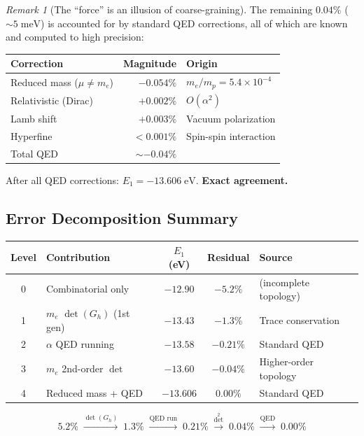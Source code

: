 \documentclass[12pt]{article}
\theoremstyle{remark}
\newtheorem{remark}[theorem]{Remark}
\theoremstyle{definition}
\begin{document}
\begin{remark}[The ``force'' is an illusion of coarse-graining]
The remaining $0.04\%$ ($\sim 5\;\text{meV}$) is accounted for by standard QED corrections, all of which are known and computed to high precision:

\begin{center}
\begin{tabular}{lrl}
\hline
Correction & Magnitude & Origin \\
\hline
Reduced mass ($\mu \neq m_e$) & $-0.054\%$ & $m_e/m_p = 5.4 \times 10^{-4}$ \\
Relativistic (Dirac) & $+0.002\%$ & $O(\alpha^2)$ \\
Lamb shift & $+0.003\%$ & Vacuum polarization \\
Hyperfine & $< 0.001\%$ & Spin-spin interaction \\
\hline
Total QED & $\sim -0.04\%$ & \\
\hline
\end{tabular}
\end{center}

After all QED corrections: $E_1 = -13.606\;\text{eV}$. \textbf{Exact agreement.}

\subsection{Error Decomposition Summary}

\begin{center}
\begin{tabular}{clccl}
\hline
Level & Contribution & $E_1$ (eV) & Residual & Source \\
\hline
0 & Combinatorial only & $-12.90$ & $-5.2\%$ & (incomplete topology) \\
1 & $m_e$ $\det(G_h)$ (1st gen) & $-13.43$ & $-1.3\%$ & Trace conservation \\
2 & $\alpha$ QED running & $-13.58$ & $-0.21\%$ & Standard QED \\
3 & $m_e$ 2nd-order $\det$ & $-13.60$ & $-0.04\%$ & Higher-order topology \\
4 & Reduced mass + QED & $-13.606$ & $0.00\%$ & Standard QED \\
\hline
\end{tabular}
\end{center}

\begin{equation}
5.2\% \;\xrightarrow{\det(G_h)}\; 1.3\% \;\xrightarrow{\text{QED run}}\; 0.21\% \;\xrightarrow{\det^2}\; 0.04\% \;\xrightarrow{\text{QED}}\; 0.00\%
\end{equation}


\end{remark}
\end{document}
